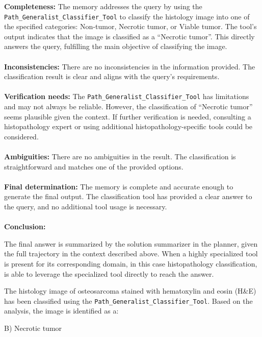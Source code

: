 \begin{plannerbox}

\textbf{Completeness:}
The memory addresses the query by using the \texttt{Path\_Generalist\_Classifier\_Tool} to classify the histology image into one of the specified categories: Non-tumor, Necrotic tumor, or Viable tumor. The tool's output indicates that the image is classified as a ``Necrotic tumor''. This directly answers the query, fulfilling the main objective of classifying the image.
\\\\
\textbf{Inconsistencies:}
There are no inconsistencies in the information provided. The classification result is clear and aligns with the query's requirements.
\\\\
\textbf{Verification needs:}
The \texttt{Path\_Generalist\_Classifier\_Tool} has limitations and may not always be reliable. However, the classification of ``Necrotic tumor'' seems plausible given the context. If further verification is needed, consulting a histopathology expert or using additional histopathology-specific tools could be considered.
\\\\
\textbf{Ambiguities:}
There are no ambiguities in the result. The classification is straightforward and matches one of the provided options.
\\\\
\textbf{Final determination:}
The memory is complete and accurate enough to generate the final output. The classification tool has provided a clear answer to the query, and no additional tool usage is necessary.
\\\\
\textbf{Conclusion:} 
\end{plannerbox}

The final answer is summarized by the solution summarizer in the planner, given the full trajectory in the context described above. When a highly specialized tool is present for its corresponding domain, in this case histopathology classification, \model is able to leverage the specialized tool directly to reach the answer.

\begin{answerbox}
The histology image of osteosarcoma stained with hematoxylin and eosin (H\&E) has been classified using the \texttt{Path\_Generalist\_Classifier\_Tool}. Based on the analysis, the image is identified as a:

B) Necrotic tumor
\end{answerbox}
